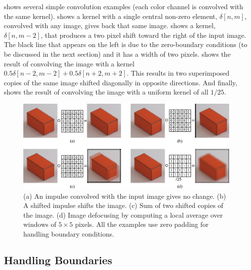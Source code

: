 \Fig{\ref{fig:convExamps}} shows several simple convolution examples (each color channel is convolved with the same kernel).  shows a kernel with a single central non-zero element, $\delta \left[n,m\right]$, convolved with any image, gives back that same image.
 shows a kernel, $\delta \left[n,m-2\right]$, that produces a two pixel shift toward the right of the input image. The black line that appears on the left is due to the zero-boundary conditions (to be discussed in the next section) and it has a width of two pixels.   shows the result of convolving the image with a kernel $0.5 \delta \left[n-2,m-2\right]+ 0.5 \delta \left[n+2,m+2\right]$. This results in two superimposed copies of the same image shifted diagonally in opposite directions. And finally,  shows the result of convolving the image with a uniform kernel of all $1/25$. 


\begin{figure}[t]
\includegraphics[width=1\linewidth]{figures/linear_image_filtering/examples_cube2.eps}
\caption{(a) An impulse convolved with the input image gives no
 change.  (b) A shifted impulse shifts the image.  (c) Sum of two shifted copies of the image.  (d) Image defocusing by computing a local average over windows of $5 \times 5$ pixels. All the examples use zero padding for handling boundary conditions.
} 
\label{fig:convExamps}
\end{figure}

\subsection{Handling Boundaries}

